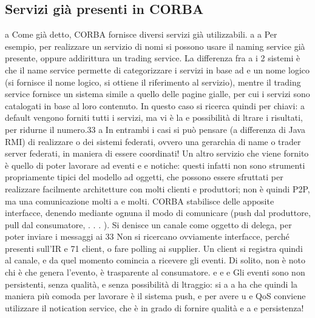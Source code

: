 \subsection{Servizi già presenti in CORBA}
a
Come già detto, CORBA fornisce diversi servizi già utilizzabili.
a
a
Per esempio, per realizzare un servizio di nomi si possono usare il naming
service già presente, oppure addirittura un trading service. La differenza fra
a
i 2 sistemi è che il name service permette di categorizzare i servizi in base ad
e
un nome logico (si fornisce il nome logico, si ottiene il riferimento al servizio),
mentre il trading service fornisce un sistema simile a quello delle pagine gialle,
per cui i servizi sono catalogati in base al loro contenuto. In questo caso si
ricerca quindi per chiavi: a default vengono forniti tutti i servizi, ma vi è la
e
possibilità di ltrare i risultati, per ridurne il numero.33
a
In entrambi i casi si può pensare (a differenza di Java RMI) di realizzare
o
dei sistemi federati, ovvero una gerarchia di name o trader server federati, in
maniera di essere coordinati!
Un altro servizio che viene fornito è quello di poter lavorare ad eventi e
e
notiche: questi infatti non sono strumenti propriamente tipici del modello ad
oggetti, che possono essere sfruttati per realizzare facilmente architetture con
molti clienti e produttori; non è quindi P2P, ma una comunicazione molti a
e
molti.
CORBA stabilisce delle apposite interfacce, denendo mediante ognuna il
modo di comunicare (push dal produttore, pull dal consumatore, . . . ). Si
denisce un canale come oggetto di delega, per poter inviare i messaggi ai
33 Non
si ricercano ovviamente interfacce, perché presenti sull'IR
e
71
client, o fare polling ai supplier. Un client si registra quindi al canale, e da
quel momento comincia a ricevere gli eventi.
Di solito, non è noto chi è che genera l'evento, è trasparente al consumatore.
e
e
e
Gli eventi sono non persistenti, senza qualità, e senza possibilità di ltraggio: si
a
a
ha che quindi la maniera più comoda per lavorare è il sistema push, e per avere
u
e
QoS conviene utilizzare il notication service, che è in grado di fornire qualità
e
a
e persistenza!